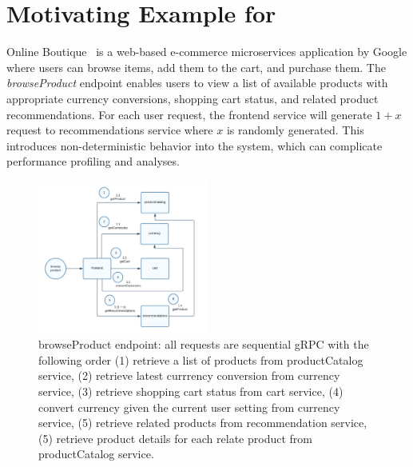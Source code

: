 
\section{Motivating Example for \ours}
Online Boutique~\cite{online-boutique}
is a web-based e-commerce microservices application by Google where users can browse items, add them to the cart, and purchase them.
The \textit{browseProduct} endpoint enables users to view a list of available products with 
appropriate currency conversions, shopping cart status, and related product recommendations. 
For each user request, the frontend service will generate $1+x$ request to recommendations service where $x$ is randomly generated.
This introduces non-deterministic behavior into the system, which can complicate performance profiling and analyses.


\begin{figure}[h]
    \centering
    \includegraphics[width=0.5\textwidth]{img/browse-product}
    \caption{browseProduct endpoint: all requests are sequential gRPC 
    with the following order 
    (1) retrieve a list of products from productCatalog service, 
    (2) retrieve latest currrency conversion from currency service, 
    (3) retrieve shopping cart status from cart service, 
    (4) convert currency given the current user setting from currency service,
    (5) retrieve related products from recommendation service,
    (5) retrieve product details for each relate product from productCatalog service.}
    \label{fig:example}
\end{figure}

